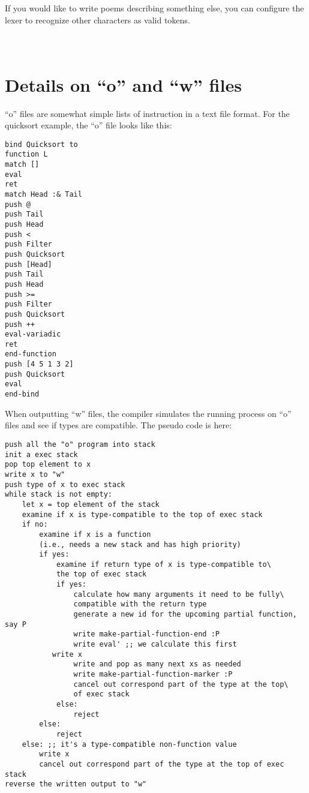 \documentclass{article}
\begin{document}
If you would like to write poems describing something else, you can configure the lexer to recognize other characters as valid tokens.

\appendix
\section{\\Details on ``o'' and ``w'' files} \label{appI}
``o'' files are somewhat simple lists of instruction in a text file format. For the quicksort example, the ``o'' file looks like this:

\begin{Verbatim}
bind Quicksort to
function L
match []
eval
ret
match Head :& Tail
push @
push Tail
push Head
push <
push Filter
push Quicksort
push [Head]
push Tail
push Head
push >=
push Filter
push Quicksort
push ++
eval-variadic
ret
end-function
push [4 5 1 3 2]
push Quicksort
eval
end-bind
\end{Verbatim}

When outputting ``w'' files, the compiler simulates the running process on ``o'' files and see if types are compatible. The pseudo code is here:

\begin{Verbatim}
push all the "o" program into stack
init a exec stack
pop top element to x
write x to "w"
push type of x to exec stack
while stack is not empty:
    let x = top element of the stack
    examine if x is type-compatible to the top of exec stack
    if no:
        examine if x is a function
        (i.e., needs a new stack and has high priority)
        if yes:
            examine if return type of x is type-compatible to\
            the top of exec stack
            if yes:
                calculate how many arguments it need to be fully\
                compatible with the return type
                generate a new id for the upcoming partial function, say P
                write make-partial-function-end :P
                write eval' ;; we calculate this first
     	   write x
                write and pop as many next xs as needed
                write make-partial-function-marker :P
                cancel out correspond part of the type at the top\
                of exec stack
            else:
                reject
        else:
            reject
    else: ;; it's a type-compatible non-function value
        write x
        cancel out correspond part of the type at the top of exec stack
reverse the written output to "w"
\end{Verbatim}
\end{document}

